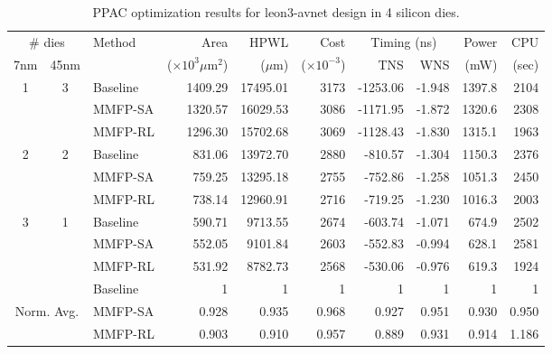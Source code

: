 \begin{table*}[!ht]
\centering
\caption{PPAC optimization results for leon3-avnet design in 4 silicon dies.}
\begin{tabular}{cclrrrrrrr}
\hline
\multicolumn{2}{c}{\# dies} & \multirow{2}{*}{Method} & Area & HPWL & Cost & \multicolumn{2}{c}{Timing (ns)} & Power & CPU \\
\cline{1-2} \cline{7-8}
7nm & 45nm & & ($\times10^3 \mu$m$^2$) & ($\mu$m) & ($\times10^{-3}$) & TNS & WNS & (mW) & (sec) \\
\hline
\hline
\multirow{3}{*}{1} & \multirow{3}{*}{3} & Baseline & 1409.29 & 17495.01 & 3173 & -1253.06 & -1.948 & 1397.8 & 2104 \\
& & MMFP-SA & 1320.57 & 16029.53 & 3086 & -1171.95 & -1.872 & 1320.6 & 2308 \\
& & MMFP-RL & 1296.30 & 15702.68 & 3069 & -1128.43 & -1.830 & 1315.1 & 1963 \\
\hline
\multirow{3}{*}{2} & \multirow{3}{*}{2} & Baseline & 831.06 & 13972.70 & 2880 & -810.57 & -1.304 & 1150.3 & 2376 \\
& & MMFP-SA & 759.25 & 13295.18 & 2755 & -752.86 & -1.258 & 1051.3 & 2450 \\
& & MMFP-RL & 738.14 & 12960.91 & 2716 & -719.25 & -1.230 & 1016.3 & 2003 \\
\hline
\multirow{3}{*}{3} & \multirow{3}{*}{1} & Baseline & 590.71 & 9713.55 & 2674 & -603.74 & -1.071 & 674.9 & 2502 \\
& & MMFP-SA & 552.05 & 9101.84 & 2603 & -552.83 & -0.994 & 628.1 & 2581 \\
& & MMFP-RL & 531.92 & 8782.73 & 2568 & -530.06 & -0.976 & 619.3 & 1924 \\
\hline
\hline
& & Baseline & 1 & 1 & 1 & 1 & 1 & 1 & 1 \\
\multicolumn{2}{c}{Norm. Avg.}  & MMFP-SA & 0.928 & 0.935 & 0.968 & 0.927 & 0.951 & 0.930 & 0.950 \\
& & MMFP-RL & 0.903 & 0.910 & 0.957 & 0.889 & 0.931 & 0.914 & 1.186 \\
\hline
\end{tabular}
\label{tab:4die_optimization}
\end{table*}